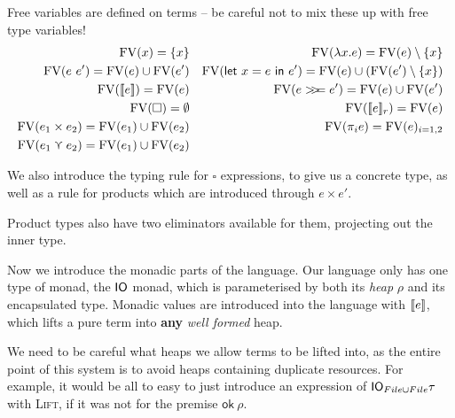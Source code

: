 Free variables are defined on terms -- be careful not to mix these up
with free type variables!
\begin{align*}
  \fv(x) = \{ x \} && \fv(\lambda x . e) = \fv(e) \setminus \{ x \} \\
  \fv(e \ e') = \fv(e) \cup \fv(e') && \fv(\letin{x = e}{e'}) = \fv(e) \cup
                                    (\fv(e') \setminus \{ x \}) \\
  \fv(\lift{e}) = \fv(e) && \fv(e \bind e') = \fv(e) \cup \fv(e') \\
  \fv(\square) = \emptyset && \fv(\use{r}{e}) = \fv(e) \\
  \fv(e_1 \times e_2) = \fv(e_1) \cup \fv(e_2) && \fv(\pi_i e) = \fv(e)_{i = 1,
                                          2} \\
  \fv(e_1 \curlyvee e_2) = \fv(e_1) \cup \fv(e_2)
\end{align*}
  
We also introduce the typing rule for $\square$ expressions, to give us a
concrete type, as well as a rule for products which are introduced
through $e \times e'$.
Product types also have two eliminators available for them, projecting
out the inner type.

Now we introduce the monadic parts of the language. Our language only
has one type of monad, the $\IO$ monad, which is parameterised by both
its \textit{heap} $\rho$ and its encapsulated type. Monadic values are
introduced into the language with $\lift{e}$, which lifts a pure term into
\textbf{any} \textit{well formed} heap. 
\begin{mathpar}
\end{mathpar}
We need to be careful what heaps we allow terms to be lifted into, as
the entire point of this system is to avoid heaps containing duplicate
resources. For example, it would be all to easy to just introduce an
expression of $\IO_{File \cup File} \tau$ with \textsc{Lift}, if it was not
for the premise $\textsf{ok} \ \rho$.

